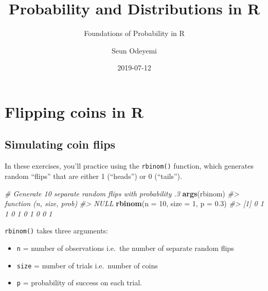 \documentclass[]{article}
\title{Probability and Distributions in R}
\subtitle{Foundations of Probability in R}
\author{Seun Odeyemi}
\date{2019-07-12}
\newenvironment{Shaded}{\begin{snugshade}}{\end{snugshade}}
\newcommand{\CommentTok}[1]{\textcolor[rgb]{0.56,0.35,0.01}{\textit{#1}}}
\newcommand{\DataTypeTok}[1]{\textcolor[rgb]{0.13,0.29,0.53}{#1}}
\newcommand{\DecValTok}[1]{\textcolor[rgb]{0.00,0.00,0.81}{#1}}
\newcommand{\FloatTok}[1]{\textcolor[rgb]{0.00,0.00,0.81}{#1}}
\newcommand{\KeywordTok}[1]{\textcolor[rgb]{0.13,0.29,0.53}{\textbf{#1}}}
\newcommand{\NormalTok}[1]{#1}
\newcommand{\OperatorTok}[1]{\textcolor[rgb]{0.81,0.36,0.00}{\textbf{#1}}}
\newcommand{\OtherTok}[1]{\textcolor[rgb]{0.56,0.35,0.01}{#1}}
\newcommand{\StringTok}[1]{\textcolor[rgb]{0.31,0.60,0.02}{#1}}
\providecommand{\tightlist}{%
  \setlength{\itemsep}{0pt}\setlength{\parskip}{0pt}}
\begin{document}
\maketitle

\begin{Shaded}
\end{Shaded}

\hypertarget{flipping-coins-in-r}{%
\section{Flipping coins in R}\label{flipping-coins-in-r}}

\hypertarget{simulating-coin-flips}{%
\subsection{Simulating coin flips}\label{simulating-coin-flips}}

In these exercises, you'll practice using the \texttt{rbinom()}
function, which generates random ``flips'' that are either 1 (``heads'')
or 0 (``tails'').

\begin{Shaded}
\begin{Highlighting}[]
\CommentTok{# Generate 10 separate random flips with probability .3}
\KeywordTok{args}\NormalTok{(rbinom)}
\CommentTok{#> function (n, size, prob) }
\CommentTok{#> NULL}
\KeywordTok{rbinom}\NormalTok{(}\DataTypeTok{n =} \DecValTok{10}\NormalTok{, }\DataTypeTok{size =} \DecValTok{1}\NormalTok{, }\DataTypeTok{p =} \FloatTok{0.3}\NormalTok{)}
\CommentTok{#>  [1] 0 1 1 0 1 0 1 0 0 1}
\end{Highlighting}
\end{Shaded}

\texttt{rbinom()} takes three arguments:

\begin{itemize}
\tightlist
\item
  \texttt{n} = number of observations i.e.~the number of separate random
  flips
\item
  \texttt{size} = number of trials i.e.~number of coins
\item
  \texttt{p} = probability of success on each trial.
\end{itemize}
\end{document}
